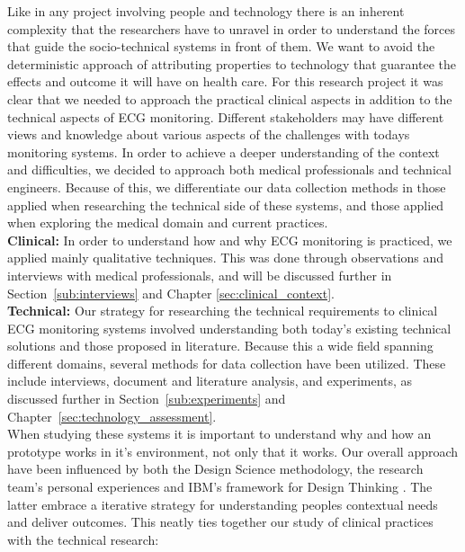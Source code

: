 Like in any project involving people and technology there is an inherent complexity that the researchers have to unravel in order to understand the forces that guide the socio-technical systems in front of them. We want to avoid the deterministic approach of attributing properties to technology that guarantee the effects and outcome it will have on health care. For this research project it was clear that we needed to approach the practical clinical aspects in addition to the technical aspects of ECG monitoring. Different stakeholders may have different views and knowledge about various aspects of the challenges with todays monitoring systems. In order to achieve a deeper understanding of the context and difficulties, we decided to approach both medical professionals and technical engineers. Because of this, we differentiate our data collection methods in those applied when researching the technical side of these systems, and those applied when exploring the medical domain and current practices.\\
\newline
\noindent
\textbf{Clinical:} In order to understand how and why ECG monitoring is practiced, we applied mainly qualitative techniques. This was done through observations and interviews with medical professionals, and will be discussed further in Section~\ref{sub:interviews} and Chapter \ref{sec:clinical_context}.\\
\newline
\noindent
\textbf{Technical:} Our strategy for researching the technical requirements to clinical ECG monitoring systems involved understanding both today's existing technical solutions and those proposed in literature. Because this a wide field spanning different domains, several methods for data collection have been utilized. These include interviews, document and literature analysis, and experiments, as discussed further in Section~\ref{sub:experiments} and Chapter~\ref{sec:technology_assessment}.
\\
\newline
\noindent
When studying these systems it is important to understand why and how an prototype works in it's environment, not only that it works. Our overall approach have been influenced by both the Design Science methodology, the research team's personal experiences and IBM's framework for Design Thinking \cite{ibmDesignThinking}. The latter embrace a iterative strategy for understanding peoples contextual needs and deliver outcomes. This neatly ties together our study of clinical practices with the technical research:

